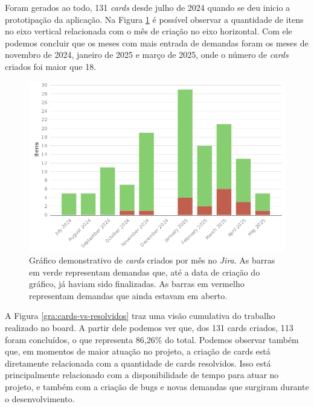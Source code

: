 Foram gerados ao todo, 131 \textit{cards} desde julho de 2024 quando se deu inicio a prototipação 
da aplicação. Na Figura \ref{gra:cards-mes} é possível observar a quantidade de itens no eixo vertical
relacionada com o mês de criação no eixo horizontal. Com ele podemos concluir que os meses com 
mais entrada de demandas foram os meses de novembro de 2024, janeiro de 2025 e março de 2025,
onde o número de \textit{cards} criados foi maior que 18.

\begin{figure}[H]
    \centering
    \includegraphics[width=\textwidth]{imagens/itensMes.png}
    \caption{Gráfico demonstrativo de \textit{cards} criados por mês no \textit{Jira}. As 
    barras em verde representam demandas que, até a data de criação do gráfico, já haviam sido finalizadas.
    As barras em vermelho representam demandas que ainda estavam em aberto.}
    \label{gra:cards-mes}
\end{figure}

A Figura \ref{gra:cards-vs-resolvidos} traz uma visão cumulativa do trabalho realizado no board.
A partir dele podemos ver que, dos 131 cards criados, 113 foram concluídos, o que representa 86,26\% 
do total. Podemos observar também que, em momentos de maior atuação no projeto, a criação de 
cards está diretamente relacionada com a quantidade de cards resolvidos.
Isso está principalmente relacionado com a disponibilidade de tempo para atuar no projeto, e também
com a criação de bugs e novas demandas que surgiram durante o desenvolvimento.

